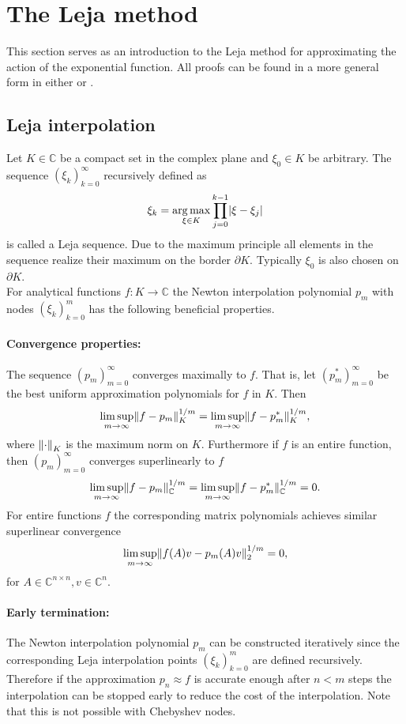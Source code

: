\documentclass{scrartcl}
\begin{document}
	\section{The Leja method}
	This section serves as an introduction to the Leja method for approximating the action of the exponential function. All proofs can be found in a more general form in either \cite{advdif} or \cite{lejarev}. 
	
	\subsection{Leja interpolation}
	Let $K\in\mathbb{C}$ be a compact set in the complex plane and $\xi_0\in K$ be arbitrary. The sequence $(\xi_k)_{k=0}^{\infty}$ recursively defined as
	\[\xi_k = \underset{{\xi\in K}}{\operatorname{arg\,max}}\displaystyle\prod_{j=0}^{k-1}\lvert\xi-\xi_j\rvert\]
	is called a Leja sequence. Due to the maximum principle all elements in the sequence realize their maximum on the border $\partial K$. Typically $\xi_0$ is also chosen on $\partial K$.\\
	For analytical functions $f\!:K\to\mathbb{C}$ the Newton interpolation polynomial $p_m$ with nodes $(\xi_k)_{k=0}^{m}$ has the following beneficial properties. 
	\paragraph{Convergence properties:}
	The sequence $(p_m)_{m=0}^\infty$ converges maximally to $f$. That is, let $(p_m^{*})_{m=0}^\infty$ be the best uniform approximation polynomials for $f$ in $K$. Then
	\[\limsup\limits_{m \rightarrow \infty}\lVert f-p_m\rVert_{K}^{1/m} = \limsup\limits_{m \rightarrow \infty}\lVert f-p_m^{*}\rVert_{K}^{1/m},\]
	where ${\lVert\cdot\rVert}_K$ is the maximum norm on $K$. Furthermore if $f$ is an entire function, then $(p_m)_{m=0}^\infty$ converges superlinearly to $f$
	\[\limsup\limits_{m \rightarrow \infty}\lVert f-p_m\rVert_{\mathbb{C}}^{1/m} = \limsup\limits_{m \rightarrow \infty}\lVert f-p_m^{*}\rVert_{\mathbb{C}}^{1/m} = 0. \]
	For entire functions $f$ the corresponding matrix polynomials achieves similar superlinear convergence
	\[\limsup\limits_{m \rightarrow \infty}\lVert f(A)v-p_m(A)v\rVert_{2}^{1/m} = 0, \]
	for $A\in\mathbb{C}^{n\times n}, v\in\mathbb{C}^n$.
	
	\paragraph{Early termination:}
	The Newton interpolation polynomial $p_m$ can be constructed iteratively since the corresponding Leja interpolation points $(\xi_k)_{k=0}^{m}$ are defined recursively. Therefore if the approximation $p_n \approx f$ is accurate enough after $n<m$ steps the interpolation can be stopped early to reduce the cost of the interpolation. Note that this is not possible with Chebyshev nodes.
	
\end{document}

